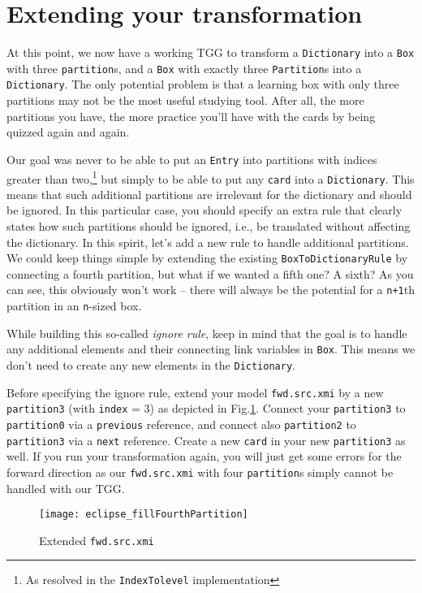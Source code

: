 \newpage
\section{Extending your transformation}
\genHeader

At this point, we now have a working TGG to transform a \texttt{Dictionary} into a \texttt{Box} with three \texttt{partition}s, and a \texttt{Box} with
exactly three \texttt{Partition}s into a \texttt{Dictionary}. The only potential problem is that a learning box with only three partitions may not be the most
useful studying tool. After all, the more partitions you have, the more practice you'll have with the cards by being quizzed again and again.

Our goal was never to be able to put an \texttt{Entry} into
partitions with indices greater than two,\footnote{As resolved in the \texttt{IndexTolevel} implementation} but simply to be able to put any \texttt{card} into
a \texttt{Dictionary}. This means that such additional partitions are irrelevant for the dictionary and should be ignored. 
In this particular case, you should specify
an extra rule that clearly states how such partitions should be ignored, i.e., be translated without affecting the dictionary. In this spirit, let's add a new
rule to handle additional partitions. We could keep things simple by extending the existing \texttt{BoxToDictionaryRule} by connecting a fourth partition, but
what if we wanted a fifth one? A sixth? As you can see, this obviously won't work -- there will always be the potential for a \texttt{n+1}th partition in an \texttt{n}-sized box. 

While building this so-called \emph{ignore rule}, keep in mind that the goal is to handle any additional elements and their connecting link variables in \texttt{Box}.
This means we don't need to create any new elements in the \texttt{Dictionary}.

Before specifying the ignore rule, extend your model \texttt{fwd.src.xmi} by a new \texttt{partition3} (with \texttt{index} = 3) as depicted in Fig.\ref{fig:ea_extended_fwd_src_xmi}.
Connect your \texttt{partition3}  to \texttt{partition0} via a \texttt{previous} reference, and connect also \texttt{partition2} to \texttt{partition3} via a \texttt{next} reference.
Create a new \texttt{card} in your new \texttt{partition3} as well.
If you run your transformation again, you will just get some errors for the forward direction as our \texttt{fwd.src.xmi} with four \texttt{partition}s simply cannot be handled with our TGG.

\begin{figure}[htbp]
\begin{center}
  \texttt{[image: eclipse\_fillFourthPartition]}
  \caption{Extended \texttt{fwd.src.xmi}}
  \label{fig:ea_extended_fwd_src_xmi}
\end{center}
\end{figure}


